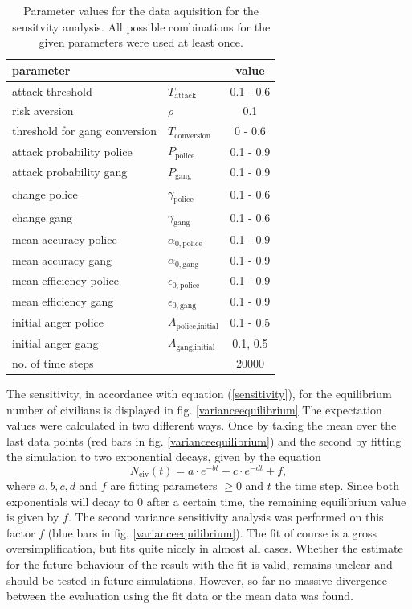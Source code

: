 \documentclass[11pt]{article}
\begin{document}
\begin{table}
\centering
\begin{tabular}{llc}
\hline
parameter && value \\
\hline
attack threshold  &$T_{\text{attack}}$ &0.1 - 0.6\\
risk aversion& $\rho$ &0.1\\
threshold for gang conversion \qquad & $T_{\text{conversion}}$ &0 - 0.6\\
attack probability police&  $P_{\text{police}}$ &0.1 - 0.9\\
attack probability gang&  $P_{\text{gang}}$ &0.1 - 0.9\\
change police& $\gamma_{\text{police}}$ &0.1 - 0.6\\
change gang &$\gamma_{\text{gang}}$& 0.1 - 0.6\\
mean accuracy police &$\alpha_{0,\text{police}}$ &0.1 - 0.9\\
mean accuracy gang &$\alpha_{0,\text{gang}}$ &0.1 - 0.9\\
mean efficiency police& $\epsilon_{0,\text{police}}$ &0.1 - 0.9\\
mean efficiency gang &$\epsilon_{0,\text{gang}}$ &0.1 - 0.9\\
initial anger police &$A_{\text{police,initial}}$ &0.1 - 0.5\\
initial anger gang &$A_{\text{gang,initial}}$ &0.1, 0.5\\
no. of time steps && 20000
\end{tabular}
\caption{Parameter values for the data aquisition for the sensitvity analysis. All possible combinations for the given parameters were used at least once.}\label{varianceparameters}
\end{table}

The sensitivity, in accordance with equation (\ref{sensitivity}), for the equilibrium number of civilians is displayed in fig. \ref{varianceequilibrium} The expectation values were calculated in two different ways. Once by taking the mean over the last data points (red bars in fig. \ref{varianceequilibrium}) and the second by fitting the simulation to two exponential decays, given by the equation
\begin{equation}
N_{\text{civ}}(t)=a\cdot e^{-bt}-c\cdot e^{-dt} +f,\label{fit}
\end{equation}
where $a,b,c,d$ and $f$ are fitting parameters $\ge 0$ and $t$ the time step. Since both exponentials will decay to $0$ after a certain time, the remaining equilibrium value is given by $f$. The second variance sensitivity analysis was performed on this factor $f$ (blue bars in fig. \ref{varianceequilibrium}). The fit of course is a gross oversimplification, but fits quite nicely in almost all cases. Whether the estimate for the future behaviour of the result with the fit is valid, remains unclear and should be tested in future simulations. However, so far no massive divergence between the evaluation using the fit data or the mean data was found.
\end{document}
